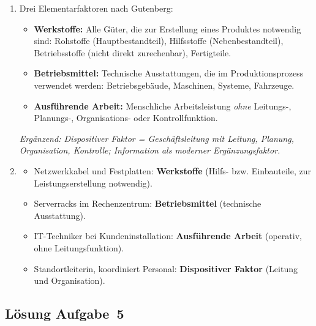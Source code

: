 \documentclass[11pt, a4paper]{article}
\begin{document}
\begin{enumerate}[label=(\alph*)]
  \item Drei Elementarfaktoren nach Gutenberg:
  \begin{itemize}
    \item \textbf{Werkstoffe:} Alle Güter, die zur Erstellung eines Produktes notwendig sind:
    Rohstoffe (Hauptbestandteil), Hilfsstoffe (Nebenbestandteil), Betriebsstoffe (nicht
    direkt zurechenbar), Fertigteile.
    \item \textbf{Betriebsmittel:} Technische Ausstattungen, die im Produktionsprozess
    verwendet werden: Betriebsgebäude, Maschinen, Systeme, Fahrzeuge.
    \item \textbf{Ausführende Arbeit:} Menschliche Arbeitsleistung \emph{ohne} Leitungs-,
    Planungs-, Organisations- oder Kontrollfunktion.
  \end{itemize}
  \textit{Ergänzend: Dispositiver Faktor = Geschäftsleitung mit Leitung, Planung, Organisation,
  Kontrolle; Information als moderner Ergänzungsfaktor.}

  \item
  \begin{itemize}
    \item Netzwerkkabel und Festplatten: \textbf{Werkstoffe} (Hilfs- bzw. Einbauteile, zur Leistungserstellung notwendig).
    \item Serverracks im Rechenzentrum: \textbf{Betriebsmittel} (technische Ausstattung).
    \item IT-Techniker bei Kundeninstallation: \textbf{Ausführende Arbeit} (operativ, ohne Leitungsfunktion).
    \item Standortleiterin, koordiniert Personal: \textbf{Dispositiver Faktor} (Leitung und Organisation).
  \end{itemize}
\end{enumerate}

\subsection*{Lösung Aufgabe~5}
\end{document}
